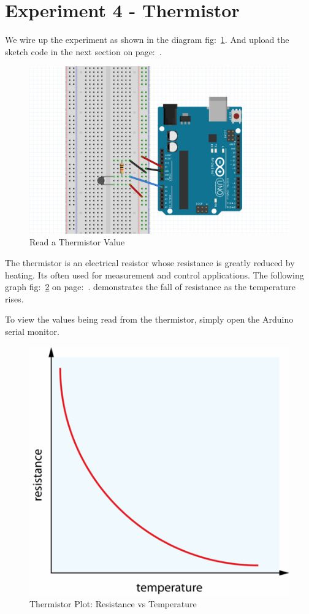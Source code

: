 \chapter*{Experiment 4 - Thermistor}
We wire up the experiment as shown in the diagram fig:~\ref{fig:exp4_thermistor}. And upload the sketch code in the next section on page:~\pageref{sketch:exp4}.

%
\begin{figure}[ht]
	\centering
	\includegraphics[width=12cm]{images/19}
	\caption{Read a Thermistor Value}
	\label{fig:exp4_thermistor}
\end{figure}
%

The thermistor is an electrical resistor whose resistance is greatly reduced by heating. Its often used for measurement and control applications. The following graph fig:~\ref{fig:exp4_thermistor_plot} on page:~\pageref{fig:exp4_thermistor_plot}. demonstrates the fall of resistance as the temperature rises.

To view the values being read from the thermistor, simply open the Arduino serial monitor.

%
\begin{figure}[ht]
	\centering
	\includegraphics[width=12cm]{images/20}
	\caption{Thermistor Plot: Resistance vs Temperature}
	\label{fig:exp4_thermistor_plot}
\end{figure}
%

